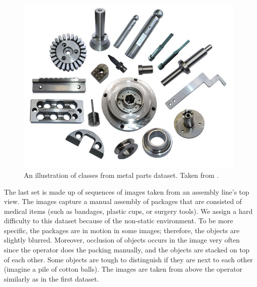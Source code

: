 \begin{figure}[ht]
    \centering
    \includegraphics[height=0.35\linewidth]{Sources/Figures/metal_parts.jpg}
    \caption{An illustration of classes from metal parts dataset. Taken from \cite{parts}.} 
    \label{fig:parts}
\end{figure}

 The last set is made up of sequences of images taken from an assembly line's top view. The images capture a manual assembly of packages that are consisted of medical items (such as bandages, plastic cups, or surgery tools). We assign a hard difficulty to this dataset because of the non-static environment. To be more specific, the packages are in motion in some images; therefore, the objects are slightly blurred. Moreover, occlusion of objects occurs in the image very often since the operator does the packing manually, and the objects are stacked on top of each other. Some objects are tough to distinguish if they are next to each other (imagine a pile of cotton balls). The images are taken from above the operator similarly as in the first dataset.





 
